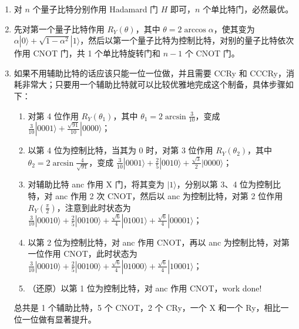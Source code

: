\documentclass{ctexart}
\newcommand{\ket}[1]{|#1\rangle}
\begin{document}
\begin{enumerate}
    \item[(a)] 对 $n$ 个量子比特分别作用 Hadamard 门 $H$ 即可，$n$ 个单比特门，必然最优。

    \item[(b)] 先对第一个量子比特作用 $R_Y(\theta)$，其中 $\theta = 2\arccos\alpha$，使其变为 $\alpha\ket{0} + \sqrt{1-\alpha^2}\ket{1}$，然后以第一个量子比特为控制比特，对别的量子比特依次作用 CNOT 门，共 1 个单比特旋转门和 $n-1$ 个 CNOT 门。

    \item[(c)] 如果不用辅助比特的话应该只能一位一位做，并且需要 CCRy 和 CCCRy，消耗非常大；只要用一个辅助比特就可以比较优雅地完成这个制备，具体步骤如下：\begin{enumerate}
        \item[(1)] 对第 4 位作用 $R_Y(\theta_1)$，其中 $\theta_1 = 2\arcsin\frac{3}{10}$，变成 $\frac{3}{10}\ket{0001} + \frac{\sqrt{91}}{10}\ket{0000}$；
        \item[(2)] 以第 4 位为控制比特，当其为 0 时，对第 3 位作用 $R_Y(\theta_2)$，其中 $\theta_2 = 2\arcsin\frac{4}{\sqrt{91}}$，变成 $\frac{3}{10}\ket{0001} + \frac{2}{5}\ket{0010} + \frac{\sqrt{3}}{2}\ket{0000}$；
        \item[(3)] 对辅助比特 anc 作用 X 门，将其变为 $\ket{1}$，分别以第 3、4 位为控制比特，对 anc 作用 2 次 CNOT，然后以 anc 为控制比特，对第 2 位作用 $R_Y(\frac{\pi}{2})$，注意到此时状态为 $\frac{3}{10}\ket{00010} + \frac{2}{5}\ket{00100} + \frac{\sqrt{6}}{4}\ket{01001} + \frac{\sqrt{6}}{4}\ket{00001}$；
        \item[(4)] 以第 2 位为控制比特，对 anc 作用 CNOT，再以 anc 为控制比特，对第一位作用 CNOT，此时状态为 $\frac{3}{10}\ket{00010} + \frac{2}{5}\ket{00100} + \frac{\sqrt{6}}{4}\ket{01000} + \frac{\sqrt{6}}{4}\ket{10001}$；
        \item[(5)] （还原）以第 1 位为控制比特，对 anc 作用 CNOT，work done!
    \end{enumerate}
    总共是 1 个辅助比特，5 个 CNOT，2 个 CRy，一个 X 和一个 Ry，相比一位一位做有显著提升。


\end{enumerate}
\end{document}
